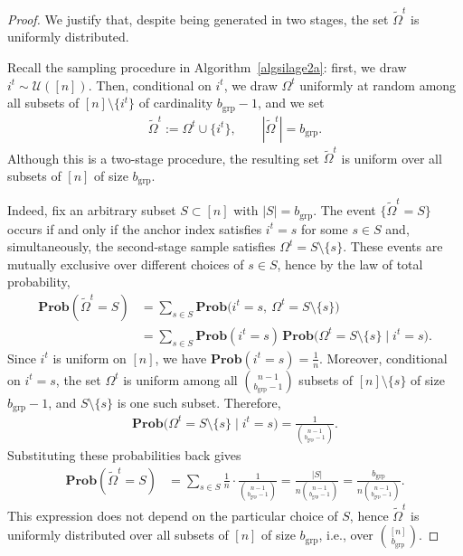 \documentclass{article}
\newcommand{\eqdef}{:=}
\newcommand{\Prob}{\mathbf{Prob}}
\theoremstyle{plain}
\begin{document}
\begin{proof}

We justify that, despite being generated in two stages, the set $\tilde{\Omega}^t$ is uniformly distributed.

Recall the sampling procedure in Algorithm~\ref{algsilage2a}: first, we draw $i^t\sim\mathcal{U}([n])$. Then, conditional on $i^t$, we draw $\Omega^t$ uniformly at random among all subsets of $[n]\setminus\{i^t\}$ of cardinality $b_{\mathrm{grp}}-1$, and we set
\begin{align*}
\tilde{\Omega}^t \eqdef \Omega^t \cup \{i^t\},
\qquad |\tilde{\Omega}^t|=b_{\mathrm{grp}}.
\end{align*}
Although this is a two-stage procedure, the resulting set $\tilde{\Omega}^t$ is uniform over all subsets of $[n]$ of size $b_{\mathrm{grp}}$.

Indeed, fix an arbitrary subset $S\subset[n]$ with $|S|=b_{\mathrm{grp}}$. The event $\{\tilde{\Omega}^t=S\}$ occurs if and only if the anchor index satisfies $i^t=s$ for some $s\in S$ and, simultaneously, the second-stage sample satisfies $\Omega^t=S\setminus\{s\}$. These events are mutually exclusive over different choices of $s\in S$, hence by the law of total probability,
\begin{align*}
\Prob(\tilde{\Omega}^t=S)
&=\sum_{s\in S}\Prob\big(i^t=s,\ \Omega^t=S\setminus\{s\}\big)\\
&=\sum_{s\in S}\Prob(i^t=s)\,\Prob\big(\Omega^t=S\setminus\{s\}\mid i^t=s\big).
\end{align*}
Since $i^t$ is uniform on $[n]$, we have $\Prob(i^t=s)=\frac{1}{n}$. Moreover, conditional on $i^t=s$, the set $\Omega^t$ is uniform among all $\binom{n-1}{b_{\mathrm{grp}}-1}$ subsets of $[n]\setminus\{s\}$ of size $b_{\mathrm{grp}}-1$, and $S\setminus\{s\}$ is one such subset. Therefore,
\begin{align*}
\Prob\big(\Omega^t=S\setminus\{s\}\mid i^t=s\big)=\frac{1}{\binom{n-1}{b_{\mathrm{grp}}-1}}.
\end{align*}
Substituting these probabilities back gives
\begin{align*}
\Prob(\tilde{\Omega}^t=S)
&=\sum_{s\in S}\frac{1}{n}\cdot\frac{1}{\binom{n-1}{b_{\mathrm{grp}}-1}}
=\frac{|S|}{n\binom{n-1}{b_{\mathrm{grp}}-1}}
=\frac{b_{\mathrm{grp}}}{n\binom{n-1}{b_{\mathrm{grp}}-1}}.
\end{align*}
This expression does not depend on the particular choice of $S$, hence $\tilde{\Omega}^t$ is uniformly distributed over all subsets of $[n]$ of size $b_{\mathrm{grp}}$, i.e., over $\binom{[n]}{b_{\mathrm{grp}}}$.


\end{proof}
\end{document}

